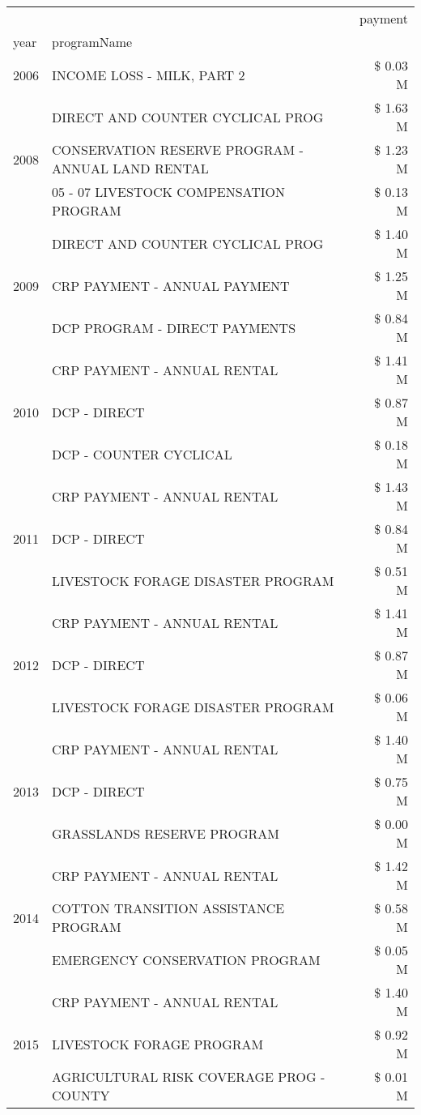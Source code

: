\begin{tabular}{llr}
\toprule
 &  & payment \\
year & programName &  \\
\midrule
2006 & INCOME LOSS - MILK, PART 2 & \$ 0.03 M \\
\cline{1-3}
\multirow[t]{3}{*}{2008} & DIRECT AND COUNTER CYCLICAL PROG & \$ 1.63 M \\
 & CONSERVATION RESERVE PROGRAM - ANNUAL LAND RENTAL & \$ 1.23 M \\
 & 05 - 07 LIVESTOCK COMPENSATION PROGRAM & \$ 0.13 M \\
\cline{1-3}
\multirow[t]{3}{*}{2009} & DIRECT AND COUNTER CYCLICAL PROG & \$ 1.40 M \\
 & CRP PAYMENT - ANNUAL PAYMENT & \$ 1.25 M \\
 & DCP PROGRAM - DIRECT PAYMENTS & \$ 0.84 M \\
\cline{1-3}
\multirow[t]{3}{*}{2010} & CRP PAYMENT - ANNUAL RENTAL & \$ 1.41 M \\
 & DCP - DIRECT & \$ 0.87 M \\
 & DCP - COUNTER CYCLICAL & \$ 0.18 M \\
\cline{1-3}
\multirow[t]{3}{*}{2011} & CRP PAYMENT - ANNUAL RENTAL & \$ 1.43 M \\
 & DCP - DIRECT & \$ 0.84 M \\
 & LIVESTOCK FORAGE DISASTER PROGRAM & \$ 0.51 M \\
\cline{1-3}
\multirow[t]{3}{*}{2012} & CRP PAYMENT - ANNUAL RENTAL & \$ 1.41 M \\
 & DCP - DIRECT & \$ 0.87 M \\
 & LIVESTOCK FORAGE DISASTER PROGRAM & \$ 0.06 M \\
\cline{1-3}
\multirow[t]{3}{*}{2013} & CRP PAYMENT - ANNUAL RENTAL & \$ 1.40 M \\
 & DCP - DIRECT & \$ 0.75 M \\
 & GRASSLANDS RESERVE PROGRAM & \$ 0.00 M \\
\cline{1-3}
\multirow[t]{3}{*}{2014} & CRP PAYMENT - ANNUAL RENTAL & \$ 1.42 M \\
 & COTTON TRANSITION ASSISTANCE PROGRAM & \$ 0.58 M \\
 & EMERGENCY CONSERVATION PROGRAM & \$ 0.05 M \\
\cline{1-3}
\multirow[t]{3}{*}{2015} & CRP PAYMENT - ANNUAL RENTAL & \$ 1.40 M \\
 & LIVESTOCK FORAGE PROGRAM & \$ 0.92 M \\
 & AGRICULTURAL RISK COVERAGE PROG - COUNTY & \$ 0.01 M \\

\end{tabular}
